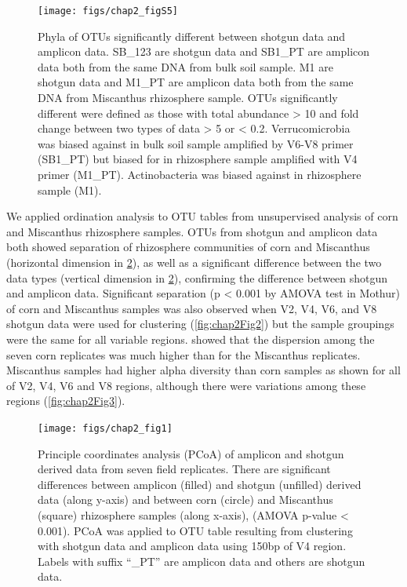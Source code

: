 \documentclass[]{msu-thesis}
\begin{document}
\begin{figure}[tbph!]
  \centering
  \texttt{[image: figs/chap2\_figS5]}
  \caption[Phyla of OTUs significantly different between shotgun data and amplicon data]{Phyla of OTUs significantly different between shotgun data and amplicon data. SB\_123 are shotgun data and SB1\_PT are amplicon data both from the same DNA from bulk soil sample. M1 are shotgun data and M1\_PT are amplicon data both from the same DNA from Miscanthus rhizosphere sample. OTUs significantly different were defined as those with total abundance > 10 and fold change between two types of data > 5 or < 0.2. Verrucomicrobia was biased against in bulk soil sample amplified by V6-V8 primer (SB1\_PT) but biased for in rhizosphere sample amplified with V4 primer (M1\_PT). Actinobacteria was biased against in rhizosphere sample (M1).}
  \label{fig:chap2FigS5}
\end{figure}


We applied ordination analysis to OTU tables from unsupervised analysis of corn and Miscanthus rhizosphere samples. OTUs from shotgun and amplicon data both showed separation of rhizosphere communities of corn and Miscanthus (horizontal dimension in \cref{fig:chap2Fig1}), as well as a significant difference between the two data types (vertical dimension in \cref{fig:chap2Fig1}), confirming the difference between shotgun and amplicon data. Significant separation (p < 0.001 by AMOVA test in Mothur) of corn and Miscanthus samples was also observed when V2, V4, V6, and V8 shotgun data were used for clustering (\cref{fig:chap2Fig2}) but the sample groupings were the same for all variable regions.  showed that the dispersion among the seven corn replicates was much higher than for the Miscanthus replicates. Miscanthus samples had higher alpha diversity than corn samples as shown for all of V2, V4, V6 and V8 regions, although there were variations among these regions (\cref{fig:chap2Fig3}).


\begin{figure}[tbph!]
  \centering
  \texttt{[image: figs/chap2\_fig1]}
  \caption[Ordination of amplicon and shotgun data from the same samples]{Principle coordinates analysis (PCoA) of amplicon and shotgun derived data from seven field replicates. There are significant differences between amplicon (filled) and shotgun (unfilled) derived data (along y-axis) and between corn (circle) and Miscanthus (square) rhizosphere samples (along x-axis), (AMOVA p-value < 0.001). PCoA was applied to OTU table resulting from clustering with shotgun data and amplicon data using 150bp of V4 region. Labels with suffix ``\_PT'' are amplicon data and others are shotgun data.}
  \label{fig:chap2Fig1}
\end{figure}
\end{document}
